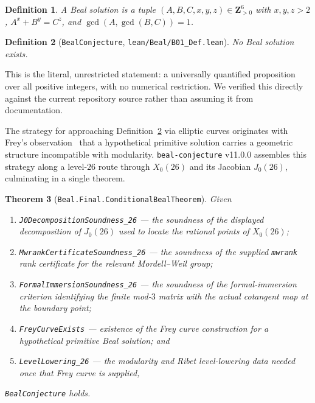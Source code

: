 \documentclass{amsart}
\newtheorem{theorem}{Theorem}[section]
\newtheorem{definition}[theorem]{Definition}
\begin{document}
\begin{definition}
A \emph{Beal solution} is a tuple $(A,B,C,x,y,z)\in\mathbf{Z}_{>0}^6$ with
$x,y,z>2$, $A^x+B^y=C^z$, and $\gcd(A,\gcd(B,C))=1$.
\end{definition}

\begin{definition}[\texttt{BealConjecture}, \texttt{lean/Beal/B01\_Def.lean}]
\label{def:bealconjecture}
No Beal solution exists.
\end{definition}

This is the literal, unrestricted statement: a universally quantified
proposition over all positive integers, with no numerical restriction. We
verified this directly against the current repository source rather than
assuming it from documentation.

The strategy for approaching Definition~\ref{def:bealconjecture} via
elliptic curves originates with Frey's observation~\cite{frey1986} that a
hypothetical primitive solution carries a geometric structure incompatible
with modularity. \texttt{beal-conjecture} v11.0.0 assembles this strategy
along a level-$26$ route through $X_0(26)$ and its Jacobian $J_0(26)$,
culminating in a single theorem.

\begin{theorem}[\texttt{Beal.Final.ConditionalBealTheorem}]
\label{thm:conditional}
Given
\begin{enumerate}
  \item \texttt{J0DecompositionSoundness\_26} — the soundness of the
  displayed decomposition of $J_0(26)$ used to locate the rational
  points of $X_0(26)$;
  \item \texttt{MwrankCertificateSoundness\_26} — the soundness of the
  supplied \texttt{mwrank} rank certificate for the relevant Mordell--Weil
  group;
  \item \texttt{FormalImmersionSoundness\_26} — the soundness of the
  formal-immersion criterion identifying the finite mod-$3$ matrix with
  the actual cotangent map at the boundary point;
  \item \texttt{FreyCurveExists} — existence of the Frey curve
  construction for a hypothetical primitive Beal solution; and
  \item \texttt{LevelLowering\_26} — the modularity and Ribet
  level-lowering data needed once that Frey curve is supplied,
\end{enumerate}
\texttt{BealConjecture} holds.
\end{theorem}
\end{document}
